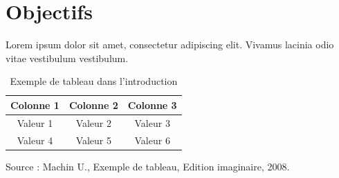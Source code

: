 \section{Objectifs}
Lorem ipsum dolor sit amet, consectetur adipiscing elit. Vivamus lacinia odio vitae vestibulum vestibulum.
\begin{table}[!ht]
    \centering
    \begin{tabular}{|c|c|c|}
        \hline
        Colonne 1 & Colonne 2 & Colonne 3 \\
        \hline
        Valeur 1 & Valeur 2 & Valeur 3 \\
        \hline
        Valeur 4 & Valeur 5 & Valeur 6 \\
        \hline
    \end{tabular}
    \caption{Exemple de tableau dans l'introduction}
    \label{tab:example_table}
    \vspace{0.2cm} %
    Source :  Machin U., Exemple de tableau, Edition imaginaire, 2008.
\end{table}


